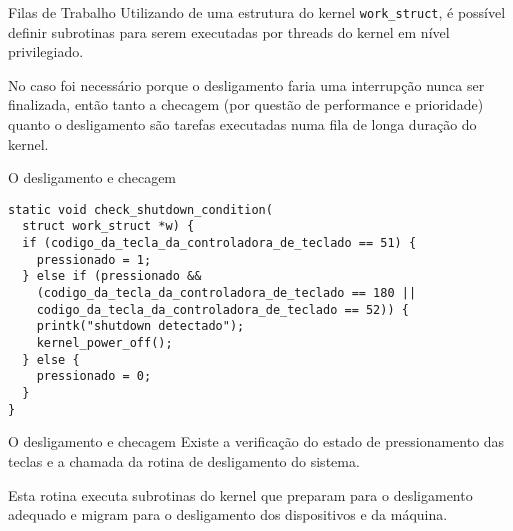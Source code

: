 \documentclass{beamer}
\begin{document}
\begin{frame}{Filas de Trabalho}
  Utilizando de uma estrutura do kernel \texttt{work\_struct}, é possível
  definir subrotinas para serem executadas por threads do kernel em nível
  privilegiado.

  No caso foi necessário porque o desligamento faria uma interrupção nunca ser
  finalizada, então tanto a checagem (por questão de performance e prioridade)
  quanto o desligamento são tarefas executadas numa fila de longa duração do
  kernel.
\end{frame}

\begin{frame}[fragile]{O desligamento e checagem}

\begin{verbatim}
static void check_shutdown_condition(
  struct work_struct *w) {
  if (codigo_da_tecla_da_controladora_de_teclado == 51) {
    pressionado = 1;
  } else if (pressionado &&
    (codigo_da_tecla_da_controladora_de_teclado == 180 ||
    codigo_da_tecla_da_controladora_de_teclado == 52)) {
    printk("shutdown detectado");
    kernel_power_off();
  } else {
    pressionado = 0;
  }
}
\end{verbatim}
\end{frame}

\begin{frame}{O desligamento e checagem}
  Existe a verificação do estado de pressionamento das teclas e a chamada da rotina de desligamento do sistema.

  Esta rotina executa subrotinas do kernel que preparam para o desligamento
  adequado e migram para o desligamento dos dispositivos e da máquina.
\end{frame}
\end{document}
